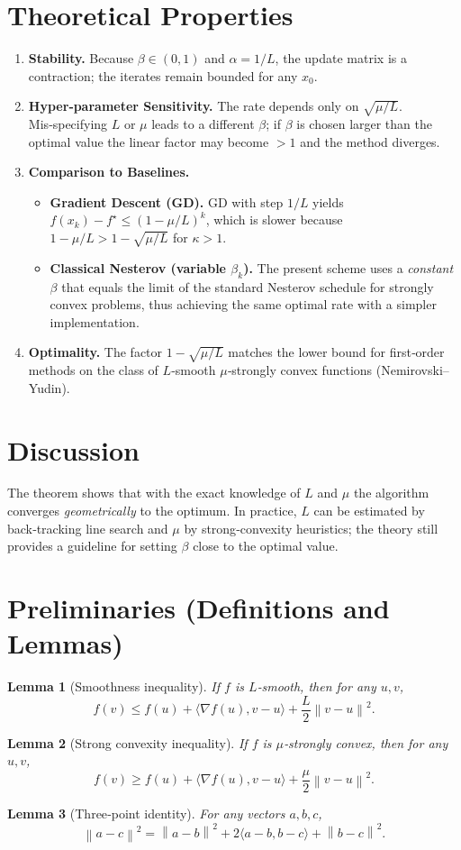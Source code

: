 \documentclass[11pt]{article}
\newtheorem{lemma}{Lemma}
\newcommand{\norm}[1]{\left\|#1\right\|}
\newcommand{\ip}[2]{\langle #1,#2\rangle}
\newcommand{\grad}{\nabla}
\begin{document}
\section*{Theoretical Properties}
\begin{enumerate}[label=\textbf{P\arabic*.},leftmargin=*]
\item \textbf{Stability.} Because $\beta\in(0,1)$ and $\alpha=1/L$, the update matrix is a contraction; the iterates remain bounded for any $x_0$.
\item \textbf{Hyper‑parameter Sensitivity.} The rate depends only on $\sqrt{\mu/L}$. Mis‑specifying $L$ or $\mu$ leads to a different $\beta$; if $\beta$ is chosen larger than the optimal value the linear factor may become $>1$ and the method diverges.
\item \textbf{Comparison to Baselines.}
    \begin{itemize}
        \item \textbf{Gradient Descent (GD).} GD with step $1/L$ yields $f(x_k)-f^\star\le (1-\mu/L)^k$, which is slower because $1-\mu/L>1-\sqrt{\mu/L}$ for $\kappa>1$.
        \item \textbf{Classical Nesterov (variable $\beta_k$).} The present scheme uses a \emph{constant} $\beta$ that equals the limit of the standard Nesterov schedule for strongly convex problems, thus achieving the same optimal rate with a simpler implementation.
    \end{itemize}
\item \textbf{Optimality.} The factor $1-\sqrt{\mu/L}$ matches the lower bound for first‑order methods on the class of $L$‑smooth $\mu$‑strongly convex functions (Nemirovski–Yudin).
\end{enumerate}

\section*{Discussion}
The theorem shows that with the exact knowledge of $L$ and $\mu$ the algorithm converges \emph{geometrically} to the optimum. In practice, $L$ can be estimated by back‑tracking line search and $\mu$ by strong‑convexity heuristics; the theory still provides a guideline for setting $\beta$ close to the optimal value.

\newpage
\section*{Preliminaries (Definitions and Lemmas)}
\begin{lemma}[Smoothness inequality]\label{lem:smooth}
If $f$ is $L$‑smooth, then for any $u,v$,
\[
f(v)\le f(u)+\ip{\grad f(u)}{v-u}+\frac{L}{2}\norm{v-u}^2.
\]
\end{lemma}
\begin{lemma}[Strong convexity inequality]\label{lem:strong}
If $f$ is $\mu$‑strongly convex, then for any $u,v$,
\[
f(v)\ge f(u)+\ip{\grad f(u)}{v-u}+\frac{\mu}{2}\norm{v-u}^2.
\]
\end{lemma}
\begin{lemma}[Three‑point identity]\label{lem:three}
For any vectors $a,b,c$,
\[
\norm{a-c}^2 = \norm{a-b}^2 + 2\ip{a-b}{b-c} + \norm{b-c}^2.
\]
\end{lemma}
\end{document}

